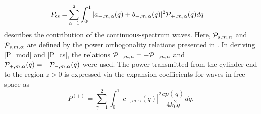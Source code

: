 \documentclass[summary]{URSIGASS2020}
\def\a{\alpha}
\begin{document}
\begin{align}
P_{\rm cs}=&\sum_{\alpha=1}^{2}\int_{0}^{1}|a_{-,m,\a}(q)+b_{-,m,\a}(q)|^2{\cal P}_{+,m,\a}(q)dq \label{P_cs}
\end{align}
describes the contribution of the continuous-spectrum waves. Here, $ {\cal P}_{s,m,n} $ and $ {\cal P}_{s,m,\alpha} $ are defined by the power orthogonality relations presented in \cite{OstafEskin_APRASC2019}.
In deriving \eqref{P_mod} and \eqref{P_cs}, the relations $ {\cal P}_{+,m,n}=-{\cal P}_{-,m,n} $ and $ {\cal P}_{+,m,\alpha}(q)=-{\cal P}_{-,m,\alpha}(q) $ were used.
The power transmitted from the cylinder end to the region $ z>0 $ is expressed via the expansion coefficients for waves in free space as
\begin{equation}\label{forward_powers}
P^{(+)}=\sum_{\gamma=1}^{2}\int_{0}^{1}|c_{+,m,\gamma}(q)|^2\frac{cp(q)}{4k_{0}^{2}q}dq.
\end{equation}
\end{document}
